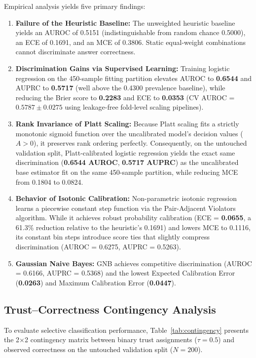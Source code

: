 \documentclass[journal,10pt]{IEEEtran}
\begin{document}
Empirical analysis yields five primary findings:
\begin{enumerate}
    \item \textbf{Failure of the Heuristic Baseline:} The unweighted heuristic baseline yields an AUROC of 0.5151 (indistinguishable from random chance 0.5000), an ECE of 0.1691, and an MCE of 0.3806. Static equal-weight combinations cannot discriminate answer correctness.
    \item \textbf{Discrimination Gains via Supervised Learning:} Training logistic regression on the 450-sample fitting partition elevates AUROC to \textbf{0.6544} and AUPRC to \textbf{0.5717} (well above the 0.4300 prevalence baseline), while reducing the Brier score to \textbf{0.2283} and ECE to \textbf{0.0353} (CV AUROC = $0.5787 \pm 0.0275$ using leakage-free fold-level scaling pipelines).
    \item \textbf{Rank Invariance of Platt Scaling:} Because Platt scaling fits a strictly monotonic sigmoid function over the uncalibrated model's decision values ($A > 0$), it preserves rank ordering perfectly. Consequently, on the untouched validation split, Platt-calibrated logistic regression yields the exact same discrimination (\textbf{0.6544 AUROC}, \textbf{0.5717 AUPRC}) as the uncalibrated base estimator fit on the same 450-sample partition, while reducing MCE from 0.1804 to 0.0824.
    \item \textbf{Behavior of Isotonic Calibration:} Non-parametric isotonic regression learns a piecewise constant step function via the Pair-Adjacent Violators algorithm. While it achieves robust probability calibration (ECE = \textbf{0.0655}, a 61.3\% reduction relative to the heuristic's 0.1691) and lowers MCE to 0.1116, its constant bin steps introduce score ties that slightly compress discrimination (AUROC = 0.6275, AUPRC = 0.5263).
    \item \textbf{Gaussian Naive Bayes:} GNB achieves competitive discrimination (AUROC = 0.6166, AUPRC = 0.5368) and the lowest Expected Calibration Error (\textbf{0.0263}) and Maximum Calibration Error (\textbf{0.0447}).
\end{enumerate}

\subsection{Trust--Correctness Contingency Analysis}
To evaluate selective classification performance, Table~\ref{tab:contingency} presents the 2$\times$2 contingency matrix between binary trust assignments ($\tau = 0.5$) and observed correctness on the untouched validation split ($N=200$).
\end{document}
